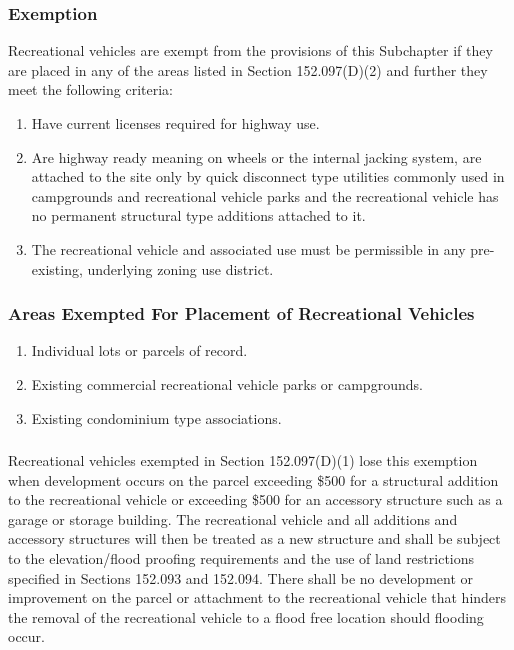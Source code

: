 \subsubsection{Exemption} Recreational vehicles are exempt from the provisions of this Subchapter if they are placed in any of the areas listed in Section 152.097(D)(2) and further they meet the following criteria:
\begin{enumerate}[{\indent}a)]
    \item Have current licenses required for highway use.
    \item Are highway ready meaning on wheels or the internal jacking system, are attached to the site only by quick disconnect type utilities commonly used in campgrounds and recreational vehicle parks and the recreational vehicle has no permanent structural type additions attached to it.
    \item The recreational vehicle and associated use must be permissible in any pre-existing, underlying zoning use district.
\end{enumerate}
\subsubsection{Areas Exempted For Placement of Recreational Vehicles}
\begin{enumerate}[{\indent}a)]
    \item Individual lots or parcels of record.
    \item Existing commercial recreational vehicle parks or campgrounds.
    \item Existing condominium type associations.
\end{enumerate}
\subsubsection{}
Recreational vehicles exempted in Section 152.097(D)(1) lose this exemption when development occurs on the parcel exceeding \$500 for a structural addition to the recreational vehicle or exceeding \$500 for an accessory structure such as a garage or storage building. The recreational vehicle and all additions and accessory structures will then be treated as a new structure and shall be subject to the elevation/flood proofing requirements and the use of land restrictions specified in Sections 152.093 and 152.094. There shall be no development or improvement on the parcel or attachment to the recreational vehicle that hinders the removal of the recreational vehicle to a flood free location should flooding occur.
